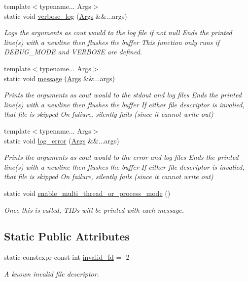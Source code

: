 \begin{DoxyCompactItemize}
{\footnotesize template$<$typename... Args$>$ }\\static void \hyperlink{class_utilities_ad7251bf1dd140719a5ff384d81dc4ac0}{verbose\-\_\-log} (\hyperlink{struct_args}{Args} \&\&...args)
\begin{DoxyCompactList}\small\item\em Logs the arguments as cout would to the log file if not null Ends the printed line(s) with a newline then flushes the buffer This function only runs if D\-E\-B\-U\-G\-\_\-\-M\-O\-D\-E and V\-E\-R\-B\-O\-S\-E are defined. \end{DoxyCompactList}\item 
{\footnotesize template$<$typename... Args$>$ }\\static void \hyperlink{class_utilities_ae8efd2e8950fe6641d87296b8120d246}{message} (\hyperlink{struct_args}{Args} \&\&...args)
\begin{DoxyCompactList}\small\item\em Prints the arguments as cout would to the stdout and log files Ends the printed line(s) with a newline then flushes the buffer If either file descriptor is invalied, that file is skipped On faliure, silently fails (since it cannot write out) \end{DoxyCompactList}\item 
{\footnotesize template$<$typename... Args$>$ }\\static void \hyperlink{class_utilities_a3db9e78ec85d66d104cbf451706e1dbe}{log\-\_\-error} (\hyperlink{struct_args}{Args} \&\&...args)
\begin{DoxyCompactList}\small\item\em Prints the arguments as cout would to the error and log files Ends the printed line(s) with a newline then flushes the buffer If either file descriptor is invalied, that file is skipped On failure, silently fails (since it cannot write out) \end{DoxyCompactList}\item 
static void \hyperlink{class_utilities_a384728ae9b72982c1351d881ba7ff007}{enable\-\_\-multi\-\_\-thread\-\_\-or\-\_\-process\-\_\-mode} ()
\begin{DoxyCompactList}\small\item\em Once this is called, T\-I\-Ds will be printed with each message. \end{DoxyCompactList}\end{DoxyCompactItemize}
\subsection*{Static Public Attributes}
\begin{DoxyCompactItemize}
\item 
static constexpr const int \hyperlink{class_utilities_a9633de25a993962a82210f566f2e98d5}{invalid\-\_\-fd} = -\/2
\begin{DoxyCompactList}\small\item\em A known invalid file descriptor. \end{DoxyCompactList}\end{DoxyCompactItemize}

